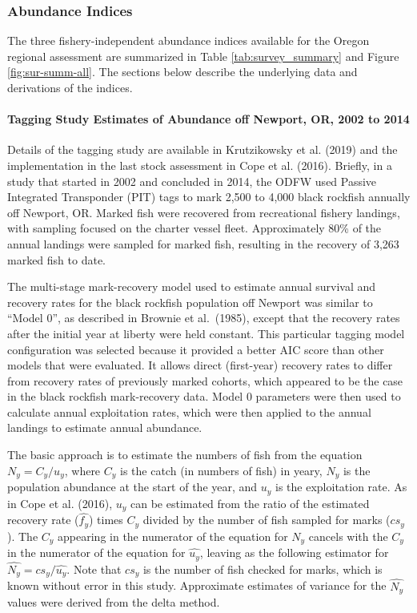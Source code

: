 \documentclass[11pt,
  english,
  letterpaper,
]{article}
\begin{document}
\hypertarget{abundance-indices}{%
\subsubsection{Abundance Indices}\label{abundance-indices}}

The three fishery-independent abundance indices available for the Oregon regional assessment are summarized in Table \ref{tab:survey_summary} and Figure \ref{fig:sur-summ-all}. The sections below describe the underlying data and derivations of the indices.

\hypertarget{tagging-study-estimates-of-abundance-off-newport-or-2002-to-2014}{%
\paragraph{Tagging Study Estimates of Abundance off Newport, OR, 2002 to 2014}\label{tagging-study-estimates-of-abundance-off-newport-or-2002-to-2014}}

Details of the tagging study are available in Krutzikowsky et al. (2019) and the implementation in the last stock assessment in Cope et al. (2016). Briefly, in a study that started in 2002 and concluded in 2014, the ODFW used Passive Integrated Transponder (PIT) tags to mark 2,500 to 4,000 black rockfish annually off Newport, OR. Marked fish were recovered from recreational fishery landings, with sampling focused on the charter vessel fleet. Approximately 80\% of the annual landings were sampled for marked fish, resulting in the recovery of 3,263 marked fish to date.

The multi-stage mark-recovery model used to estimate annual survival and recovery rates for the black rockfish population off Newport was similar to ``Model 0'', as described in Brownie et al.~(1985), except that the recovery rates after the initial year at liberty were held constant. This particular tagging model configuration was selected because it provided a better AIC score than other models that were evaluated. It allows direct (first-year) recovery rates to differ from recovery rates of previously marked cohorts, which appeared to be the case in the black rockfish mark-recovery data. Model 0 parameters were then used to calculate annual exploitation rates, which were then applied to the annual landings to estimate annual abundance.

The basic approach is to estimate the numbers of fish from the equation \(N_y= C_y/u_y\), where \(C_y\) is the catch (in numbers of fish) in yeary, \(N_y\) is the population abundance at the start of the year, and \(u_y\) is the exploitation rate. As in Cope et al. (2016), \(u_y\) can be estimated from the ratio of the estimated recovery rate (\(\hat{f_y}\)) times \(C_y\) divided by the number of fish sampled for marks (\(cs_y\)). The \(C_y\) appearing in the numerator of the equation for \(N_y\) cancels with the \(C_y\) in the numerator of the equation for \(\hat{u_y}\), leaving as the following estimator for \(\hat{N_y}=cs_y/\hat{u_y}\). Note that \(cs_y\) is the number of fish checked for marks, which is known without error in this study. Approximate estimates of variance for the \(\hat{N_y}\) values were derived from the delta method.
\end{document}
